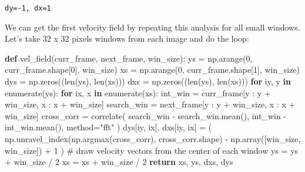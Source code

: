 \documentclass[
  english,
  letterpaper,
  numbers=noendperiod,
  DIV=13]{scrreprt}
\newenvironment{Shaded}{\begin{snugshade}}{\end{snugshade}}
\newcommand{\BuiltInTok}[1]{\textcolor[rgb]{0.00,0.23,0.31}{#1}}
\newcommand{\CommentTok}[1]{\textcolor[rgb]{0.37,0.37,0.37}{#1}}
\newcommand{\ControlFlowTok}[1]{\textcolor[rgb]{0.00,0.23,0.31}{\textbf{#1}}}
\newcommand{\DecValTok}[1]{\textcolor[rgb]{0.68,0.00,0.00}{#1}}
\newcommand{\KeywordTok}[1]{\textcolor[rgb]{0.00,0.23,0.31}{\textbf{#1}}}
\newcommand{\NormalTok}[1]{\textcolor[rgb]{0.00,0.23,0.31}{#1}}
\newcommand{\OperatorTok}[1]{\textcolor[rgb]{0.37,0.37,0.37}{#1}}
\newcommand{\StringTok}[1]{\textcolor[rgb]{0.13,0.47,0.30}{#1}}
\begin{document}
\begin{verbatim}
dy=-1, dx=1
\end{verbatim}

We can get the first velocity field by repeating this analysis for all
small windows. Let's take 32 x 32 pixels windows from each image and do
the loop:

\begin{Shaded}
\begin{Highlighting}[]
\KeywordTok{def}\NormalTok{ vel\_field(curr\_frame, next\_frame, win\_size):}
\NormalTok{    ys }\OperatorTok{=}\NormalTok{ np.arange(}\DecValTok{0}\NormalTok{, curr\_frame.shape[}\DecValTok{0}\NormalTok{], win\_size)}
\NormalTok{    xs }\OperatorTok{=}\NormalTok{ np.arange(}\DecValTok{0}\NormalTok{, curr\_frame.shape[}\DecValTok{1}\NormalTok{], win\_size)}
\NormalTok{    dys }\OperatorTok{=}\NormalTok{ np.zeros((}\BuiltInTok{len}\NormalTok{(ys), }\BuiltInTok{len}\NormalTok{(xs)))}
\NormalTok{    dxs }\OperatorTok{=}\NormalTok{ np.zeros((}\BuiltInTok{len}\NormalTok{(ys), }\BuiltInTok{len}\NormalTok{(xs)))}
    \ControlFlowTok{for}\NormalTok{ iy, y }\KeywordTok{in} \BuiltInTok{enumerate}\NormalTok{(ys):}
        \ControlFlowTok{for}\NormalTok{ ix, x }\KeywordTok{in} \BuiltInTok{enumerate}\NormalTok{(xs):}
\NormalTok{            int\_win }\OperatorTok{=}\NormalTok{ curr\_frame[y : y }\OperatorTok{+}\NormalTok{ win\_size, x : x }\OperatorTok{+}\NormalTok{ win\_size]}
\NormalTok{            search\_win }\OperatorTok{=}\NormalTok{ next\_frame[y : y }\OperatorTok{+}\NormalTok{ win\_size, x : x }\OperatorTok{+}\NormalTok{ win\_size]}
\NormalTok{            cross\_corr }\OperatorTok{=}\NormalTok{ correlate(}
\NormalTok{                search\_win }\OperatorTok{{-}}\NormalTok{ search\_win.mean(), int\_win }\OperatorTok{{-}}\NormalTok{ int\_win.mean(), method}\OperatorTok{=}\StringTok{"fft"}
\NormalTok{            )}
\NormalTok{            dys[iy, ix], dxs[iy, ix] }\OperatorTok{=}\NormalTok{ (}
\NormalTok{                np.unravel\_index(np.argmax(cross\_corr), cross\_corr.shape)}
                \OperatorTok{{-}}\NormalTok{ np.array([win\_size, win\_size])}
                \OperatorTok{+} \DecValTok{1}
\NormalTok{            )}
    \CommentTok{\# draw velocity vectors from the center of each window}
\NormalTok{    ys }\OperatorTok{=}\NormalTok{ ys }\OperatorTok{+}\NormalTok{ win\_size }\OperatorTok{/} \DecValTok{2}
\NormalTok{    xs }\OperatorTok{=}\NormalTok{ xs }\OperatorTok{+}\NormalTok{ win\_size }\OperatorTok{/} \DecValTok{2}
    \ControlFlowTok{return}\NormalTok{ xs, ys, dxs, dys}
\end{Highlighting}
\end{Shaded}
\end{document}
